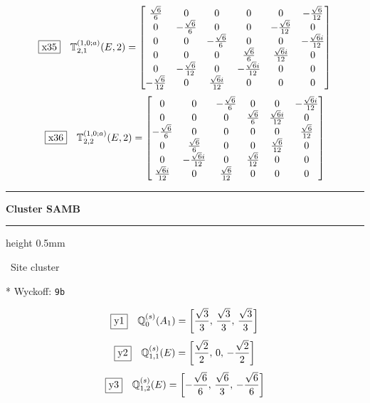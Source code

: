 \documentclass[fleqn,10pt,landscape]{jsarticle}
\begin{document}
\begin{dmath*}
\fbox{x35}\quad \mathbb{T}_{2,1}^{(1,0;a)}(E,2)=\begin{bmatrix} \frac{\sqrt{6}}{6} & 0 & 0 & 0 & 0 & - \frac{\sqrt{6}}{12} \\ 0 & - \frac{\sqrt{6}}{6} & 0 & 0 & - \frac{\sqrt{6}}{12} & 0 \\ 0 & 0 & - \frac{\sqrt{6}}{6} & 0 & 0 & - \frac{\sqrt{6} i}{12} \\ 0 & 0 & 0 & \frac{\sqrt{6}}{6} & \frac{\sqrt{6} i}{12} & 0 \\ 0 & - \frac{\sqrt{6}}{12} & 0 & - \frac{\sqrt{6} i}{12} & 0 & 0 \\ - \frac{\sqrt{6}}{12} & 0 & \frac{\sqrt{6} i}{12} & 0 & 0 & 0 \end{bmatrix}
\end{dmath*}
\begin{dmath*}
\fbox{x36}\quad \mathbb{T}_{2,2}^{(1,0;a)}(E,2)=\begin{bmatrix} 0 & 0 & - \frac{\sqrt{6}}{6} & 0 & 0 & - \frac{\sqrt{6} i}{12} \\ 0 & 0 & 0 & \frac{\sqrt{6}}{6} & \frac{\sqrt{6} i}{12} & 0 \\ - \frac{\sqrt{6}}{6} & 0 & 0 & 0 & 0 & \frac{\sqrt{6}}{12} \\ 0 & \frac{\sqrt{6}}{6} & 0 & 0 & \frac{\sqrt{6}}{12} & 0 \\ 0 & - \frac{\sqrt{6} i}{12} & 0 & \frac{\sqrt{6}}{12} & 0 & 0 \\ \frac{\sqrt{6} i}{12} & 0 & \frac{\sqrt{6}}{12} & 0 & 0 & 0 \end{bmatrix}
\end{dmath*}
\vspace{5mm}
\noindent \rule[0.5mm]{5mm}{0.5mm}\hspace{3mm}\textbf{Cluster SAMB}\hspace{3mm}\leaders\hrule height 0.5mm\hfill\kern0pt
\vspace{3mm}

\noindent\textbullet\, Site cluster

\vspace{5mm}

\noindent ** Wyckoff: \texttt{9b}

\begin{dmath*}
\fbox{y1}\quad \mathbb{Q}_{0}^{(s)}(A_{1})=\left[ \frac{\sqrt{3}}{3},\, \frac{\sqrt{3}}{3},\, \frac{\sqrt{3}}{3} \right]
\end{dmath*}
\begin{dmath*}
\fbox{y2}\quad \mathbb{Q}_{1,1}^{(s)}(E)=\left[ \frac{\sqrt{2}}{2},\, 0,\, - \frac{\sqrt{2}}{2} \right]
\end{dmath*}
\begin{dmath*}
\fbox{y3}\quad \mathbb{Q}_{1,2}^{(s)}(E)=\left[ - \frac{\sqrt{6}}{6},\, \frac{\sqrt{6}}{3},\, - \frac{\sqrt{6}}{6} \right]
\end{dmath*}
\vspace{5mm}
\end{document}
